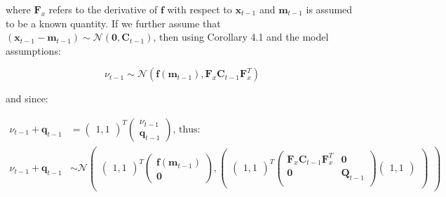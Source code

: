 \documentclass[
]{article}
\begin{document}
where \(\textbf{F}_x\) refers to the derivative of \(\textbf{f}\) with
respect to \(\textbf{x}_{t-1}\) and \(\textbf{m}_{t-1}\) is assumed to
be a known quantity. If we further assume that
\((\textbf{x}_{t-1} - \textbf{m}_{t-1}) \sim \mathcal{N}(\textbf{0}, \textbf{C}_{t-1})\),
then using Corollary 4.1 and the model assumptions:

\[
\begin{equation*}
    \nu_{t-1} \sim \mathcal{N}(\textbf{f}(\textbf{m}_{t-1}), \textbf{F}_x\textbf{C}_{t-1}\textbf{F}_x^T)
\end{equation*}
\]

and since:

\[
\begin{equation*} 
    \begin{aligned}
        \nu_{t-1} + \textbf{q}_{t-1} &= \begin{pmatrix}
            1,1
        \end{pmatrix}^T\begin{pmatrix}
            \nu_{t-1} \\
            \textbf{q}_{t-1}
        \end{pmatrix} \text{, thus: } \\
        \nu_{t-1} + \textbf{q}_{t-1} &\sim \mathcal{N}\begin{pmatrix}
                \begin{pmatrix}
                    1,1
                \end{pmatrix}^T \begin{pmatrix}
                    \textbf{f}(\textbf{m}_{t-1}) \\
                    \textbf{0}
                \end{pmatrix}, \begin{pmatrix}
                    \begin{pmatrix}
                        1,1
                    \end{pmatrix}^T \begin{pmatrix}
                        \textbf{F}_x\textbf{C}_{t-1}\textbf{F}_x^T & \textbf{0}\\
                        \textbf{0} & \textbf{Q}_{t-1}\\
                    \end{pmatrix} \begin{pmatrix}
                        1,1
                    \end{pmatrix}
                \end{pmatrix}
        \end{pmatrix} \\
    \end{aligned}
\end{equation*}
\]
\end{document}
